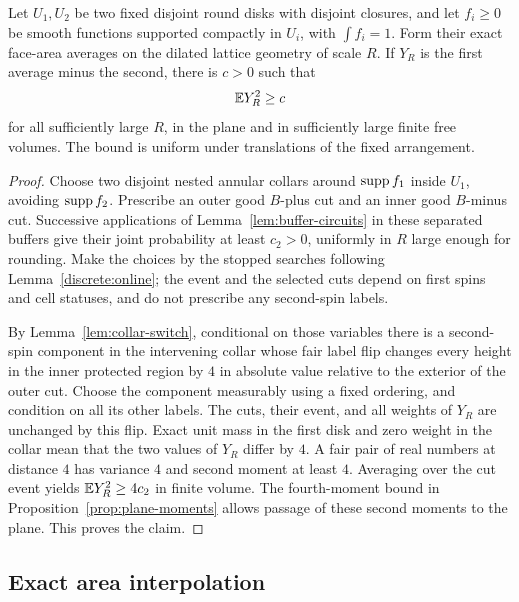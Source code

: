\begin{lemma}\label{lem:nondegeneracy}
Let $U_1,U_2$ be two fixed disjoint round disks with disjoint closures,
and let $f_i\geq0$ be smooth functions supported compactly in $U_i$,
with $\int f_i=1$.  Form their exact face-area averages on the dilated
lattice geometry of scale $R$.  If $Y_R$ is the first average minus
the second, there is $c>0$ such that
\begin{equation}\label{moments:nondegeneracy}
 \mathbb E Y_R^2\geq c
\end{equation}
for all sufficiently large $R$, in the plane and in sufficiently large
finite free volumes.  The bound is uniform under translations of the
fixed arrangement.
\end{lemma}

\begin{proof}
Choose two disjoint nested annular collars around $\operatorname{supp} f_1$ inside
$U_1$, avoiding $\operatorname{supp} f_2$.  Prescribe an outer good $B$-plus cut and
an inner good $B$-minus cut.  Successive applications of
Lemma~\ref{lem:buffer-circuits} in these separated buffers give their
joint probability at least $c_2>0$, uniformly in $R$ large enough for
rounding.  Make the choices by the stopped searches following
Lemma~\ref{discrete:online}; the event and the selected cuts
depend on first spins and cell statuses, and do not prescribe any
second-spin labels.

By Lemma~\ref{lem:collar-switch}, conditional on those variables there
is a second-spin component in the intervening collar whose fair label
flip changes every height in the inner protected region by $4$ in
absolute value relative to the exterior of the outer cut.  Choose the
component measurably using a fixed ordering, and condition on all its
other labels.  The cuts, their event, and all weights of $Y_R$ are
unchanged by this flip.  Exact unit mass in the first disk and zero
weight in the collar mean that the two values of $Y_R$ differ by $4$.
A fair pair of real numbers at distance $4$ has variance $4$ and
second moment at least $4$.  Averaging over the cut event yields
$\mathbb E Y_R^2\geq4c_2$ in finite volume.  The fourth-moment bound in
Proposition~\ref{prop:plane-moments} allows passage of these second
moments to the plane.  This proves the claim.
\end{proof}

\subsection{Exact area interpolation}

